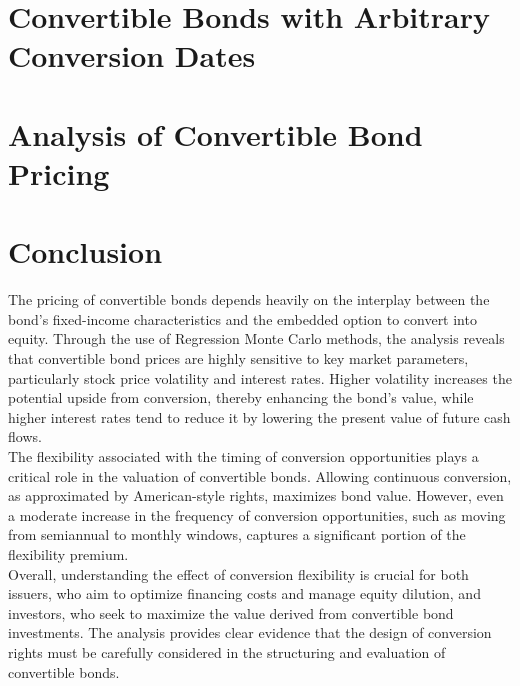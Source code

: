 \documentclass{article}
\begin{document}



\section{Convertible Bonds with Arbitrary Conversion Dates}




\section{Analysis of Convertible Bond Pricing}



\section{Conclusion}

The pricing of convertible bonds depends heavily on the interplay between the bond’s fixed-income characteristics and the embedded option to convert into equity. Through the use of Regression Monte Carlo methods, the analysis reveals that convertible bond prices are highly sensitive to key market parameters, particularly stock price volatility and interest rates. Higher volatility increases the potential upside from conversion, thereby enhancing the bond’s value, while higher interest rates tend to reduce it by lowering the present value of future cash flows.\\

The flexibility associated with the timing of conversion opportunities plays a critical role in the valuation of convertible bonds. Allowing continuous conversion, as approximated by American-style rights, maximizes bond value. However, even a moderate increase in the frequency of conversion opportunities, such as moving from semiannual to monthly windows, captures a significant portion of the flexibility premium.\\


Overall, understanding the effect of conversion flexibility is crucial for both issuers, who aim to optimize financing costs and manage equity dilution, and investors, who seek to maximize the value derived from convertible bond investments. The analysis provides clear evidence that the design of conversion rights must be carefully considered in the structuring and evaluation of convertible bonds.

\newpage

\nocite{*}


\end{document}
